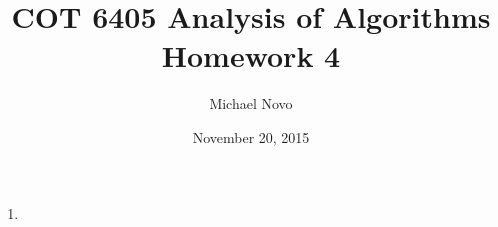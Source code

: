 \documentclass[]{report}
\title{COT 6405 Analysis of Algorithms \\ Homework 4}
\author{Michael Novo}
\date{November 20, 2015}
\begin{document}
\maketitle

\begin{enumerate}
	 \item
\end{enumerate}
\end{document}
